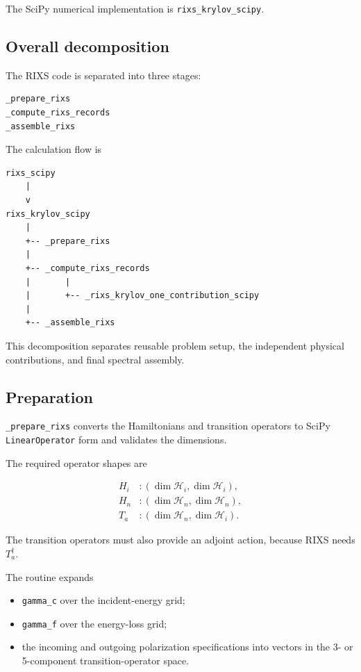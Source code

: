 \documentclass[11pt]{article}
\begin{document}
The SciPy numerical implementation is \texttt{rixs\_krylov\_scipy}.

\subsection{Overall decomposition}

The RIXS code is separated into three stages:

\begin{lstlisting}
_prepare_rixs
_compute_rixs_records
_assemble_rixs
\end{lstlisting}

The calculation flow is

\begin{lstlisting}
rixs_scipy
    |
    v
rixs_krylov_scipy
    |
    +-- _prepare_rixs
    |
    +-- _compute_rixs_records
    |       |
    |       +-- _rixs_krylov_one_contribution_scipy
    |
    +-- _assemble_rixs
\end{lstlisting}

This decomposition separates reusable problem setup, the independent physical contributions, and final spectral assembly.

\subsection{Preparation}

\texttt{\_prepare\_rixs} converts the Hamiltonians and transition operators to SciPy \texttt{LinearOperator} form and validates the dimensions.

The required operator shapes are

\begin{align}
  H_i &: (\dim\mathcal H_i,\dim\mathcal H_i),\\
  H_n &: (\dim\mathcal H_n,\dim\mathcal H_n),\\
  T_a &: (\dim\mathcal H_n,\dim\mathcal H_i).
\end{align}

The transition operators must also provide an adjoint action, because RIXS needs \(T_a^\dagger\).

The routine expands

\begin{itemize}
  \item \texttt{gamma\_c} over the incident-energy grid;
  \item \texttt{gamma\_f} over the energy-loss grid;
  \item the incoming and outgoing polarization specifications into vectors in the 3- or 5-component transition-operator space.
\end{itemize}
\end{document}
